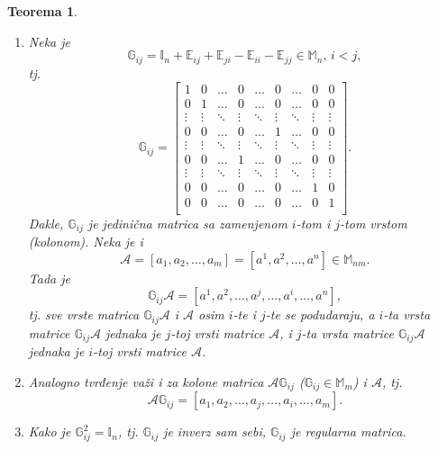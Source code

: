 \documentclass[a4paper,12pt,twoside]{report}
\newtheorem{theorem}{Teorema}[section]
\numberwithin{algorithm}{section}
\begin{document}
\begin{theorem}
    \begin{enumerate}\textbf{(EL2) - zamena dve vrste/kolone}
        \item Neka je \[\mathbb{G}_{ij} = \mathbb{I}_n + \mathbb{E}_{ij} + \mathbb{E}_{ji} - \mathbb{E}_{ii} - \mathbb{E}_{jj} \in \mathbb{M}_n, \, i < j,\]
        tj.
        \[ \mathbb{G}_{ij} = \begin{bmatrix}
            1 & 0 & \dots & 0 & \dots & 0 & \dots & 0& 0\\
            0 & 1 & \dots & 0 & \dots & 0 & \dots & 0& 0\\
            \vdots & \vdots & \ddots & \vdots & \ddots & \vdots & \ddots & \vdots& \vdots \\
            0 & 0 & \dots & 0 & \dots & 1 & \dots & 0& 0\\
            \vdots & \vdots & \ddots & \vdots & \ddots & \vdots & \ddots & \vdots& \vdots \\
            0 & 0 & \dots & 1 & \dots & 0 & \dots & 0& 0\\
            \vdots & \vdots & \ddots & \vdots & \ddots & \vdots & \ddots & \vdots& \vdots \\
            0 & 0 & \dots & 0 & \dots & 0 & \dots & 1 & 0\\
            0 & 0 & \dots & 0 & \dots & 0 & \dots & 0 & 1\\
        \end{bmatrix}. \]
        Dakle, $\mathbb{G}_{ij}$ je jedinična matrica sa zamenjenom $i$-tom i $j$-tom vrstom (kolonom). Neka je i \[\mathcal{A} = [a_1, a_2, \dots, a_m] = [a^1, a^2, \dots, a^n] \in \mathbb{M}_{nm}.\] Tada je \[\mathbb{G}_{ij} \mathcal{A} = [a^1, a^2, \dots, a^j, \dots, a^i, \dots, a^n],\] tj. sve vrste matrica $\mathbb{G}_{ij} \mathcal{A}$ i $\mathcal{A}$ osim $i$-te i $j$-te se podudaraju, a $i$-ta vrsta matrice $\mathbb{G}_{ij} \mathcal{A}$ jednaka je $j$-toj vrsti matrice $\mathcal{A}$, i $j$-ta vrsta matrice $\mathbb{G}_{ij} \mathcal{A}$ jednaka je $i$-toj vrsti matrice $\mathcal{A}$.

        \item Analogno tvrđenje važi i za kolone matrica $\mathcal{A} \mathbb{G}_{ij}$ ($\mathbb{G}_{ij} \in \mathbb{M}_m$) i $\mathcal{A}$, tj. \[\mathcal{A} \mathbb{G}_{ij} = [a_1, a_2, \dots, a_j, \dots, a_i, \dots, a_m].\]

        \item Kako je $\mathbb{G}_{ij}^2 = \mathbb{I}_n$, tj. $\mathbb{G}_{ij}$ je inverz sam sebi, $\mathbb{G}_{ij}$ je regularna matrica.
    \end{enumerate}
    \label{rangMatriceTeorema3}
\end{theorem}
\end{document}
